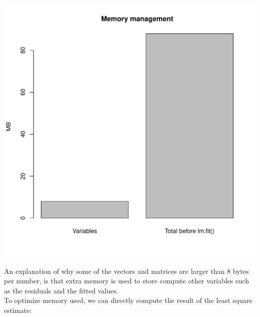\documentclass{llncs}\usepackage[]{graphicx}\usepackage[]{color}
\makeatletter
\def\maxwidth{ %
  \ifdim\Gin@nat@width>\linewidth
    \linewidth
  \else
    \Gin@nat@width
  \fi
}
\newenvironment{knitrout}{}{} %
\makeatother
\begin{document}
\begin{knitrout}
\includegraphics[width=\maxwidth]{figure/unnamed-chunk-22-2} 

\end{knitrout}
\noindent
An explanation of why some of the vectors and matrices are larger than 8 bytes per number, is that extra memory is used to store compute other variables such as the residuals and the fitted values. \\
To optimize memory used, we can directly compute the result of the least square estimate:
\end{document}

